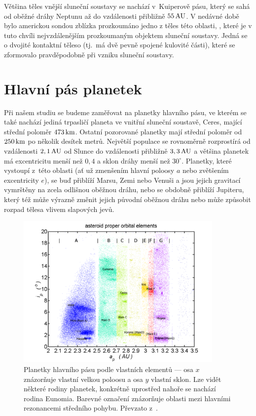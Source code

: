 \documentclass[A4paper, 12pt, oneside]{book}
\begin{document}
Většina těles vnější sluneční soustavy se nachází v~Kuiperově pásu, který se sahá od oběžné dráhy Neptunu až do vzdálenosti přibližně $55\, {\rm AU}$. V nedávné době bylo americkou sondou  zblízka prozkoumáno jedno z těles této oblasti, , které je v tuto chvíli nejvzdálenějším prozkoumaným objektem sluneční soustavy. Jedná se o dvojité kontaktní těleso (tj.\ má dvě pevně spojené kulovité části), které se zformovalo pravděpodobně při vzniku sluneční soustavy.~\cite{ultimathule}


\pagebreak
\section{Hlavní pás planetek}
Při našem studiu se budeme zaměřovat na planetky hlavního pásu, ve kterém se také nachází jediná trpasličí planeta ve vnitřní sluneční soustavě, Ceres, mající střední poloměr $473\, {\rm km}$. Ostatní pozorované planetky mají střední poloměr od $250\, {\rm km}$ po několik desítek metrů. Největší populace se rovnoměrně rozprostírá od vzdálenosti $2,1\, {\rm AU}$ od Slunce do vzdálenosti přibližně $3,3\, {\rm AU}$ a většina planetek má excentricitu menší než $0,4$ a sklon dráhy menší než $30^\circ$. Planetky, které vystoupí z~této oblasti (ať už zmenšením hlavní poloosy $a$ nebo zvětšením excentricity $e$), se buď přiblíží Marsu, Zemi nebo Venuši a jsou jejich gravitací vymrštěny na zcela odlišnou oběžnou dráhu, nebo se obdobně přiblíží Jupiteru, který též může výrazně změnit jejich původní oběžnou dráhu nebo může způsobit rozpad tělesa vlivem slapových jevů.

\begin{figure}
	\centering
	\includegraphics[width=0.9\textwidth]{obr/mainbelt.png}
	\caption{Planetky hlavního pásu podle vlastních elementů --- osa $x$ znázorňuje vlastní velkou poloosu a osa $y$ vlastní sklon. Lze vidět některé rodiny planetek, konkrétně uprostřed nahoře se nachází rodina Eunomia. Barevné označení znázorňuje oblasti mezi hlavními rezonancemi středního pohybu. Převzato z~\cite{wiki:belt}.} \label{fig:belt}
\end{figure}
\end{document}
